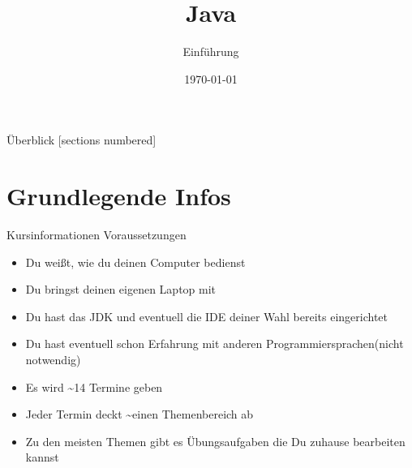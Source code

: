 

\usepackage[ngerman]{babel}
\usepackage{ulem}
\usepackage{csquotes}

\title{Java}
\subtitle{Einführung}
\date{\today}




\begin{frame}
	\titlepage
\end{frame}
\begin{frame}{Überblick}
	[sections numbered]
	\tableofcontents
\end{frame}

\section{Grundlegende Infos}
\begin{frame}{Kursinformationen}
	Voraussetzungen
    \begin{itemize}[<+->]
        \item Du weißt, wie du deinen Computer bedienst 
        \item Du bringst deinen eigenen Laptop mit
        \item Du hast das JDK und eventuell die IDE deiner Wahl bereits eingerichtet
        \item Du hast eventuell schon Erfahrung mit anderen Programmiersprachen(nicht notwendig)
	\end{itemize} 
    \begin{itemize}[<+->]
		\item Es wird \textasciitilde14 Termine geben
        \item Jeder Termin deckt \textasciitilde einen Themenbereich  ab
        \item Zu den meisten Themen gibt es Übungsaufgaben die Du zuhause bearbeiten kannst
	\end{itemize}
\end{frame}

